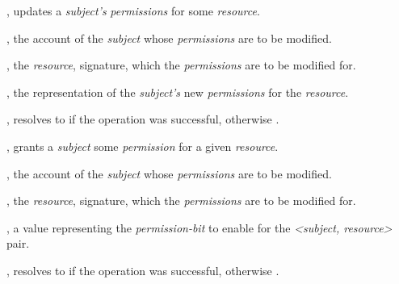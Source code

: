 \begin{interface}
\begin{functions}
    \item {},
      updates a \emph{subject's} \emph{permissions} for some \emph{resource}.

      \begin{parameters}
        \item {}, the account  of the
          \emph{subject} whose \emph{permissions} are to be modified.

        \item {}, the \emph{resource}, 
          signature, which the \emph{permissions} are to be modified for.

        \item {}, the  representation of
          the \emph{subject's} new \emph{permissions} for the \emph{resource}.
      \end{parameters}

      \begin{returns}
      \item {}, resolves to  if the operation was
        successful, otherwise .
      \end{returns}

    \item {},
      grants a \emph{subject} some \emph{permission} for a given \emph{resource}.

      \begin{parameters}
        \item {}, the account  of the
          \emph{subject} whose \emph{permissions} are to be modified.

        \item {}, the \emph{resource}, 
          signature, which the \emph{permissions} are to be modified for.

        \item {}, a  value representing the
          \emph{permission-bit} to enable for the \emph{<subject, resource>}
          pair.
      \end{parameters}

      \begin{returns}
      \item {}, resolves to  if the operation was
        successful, otherwise .
      \end{returns}


\end{functions}
\end{interface}

